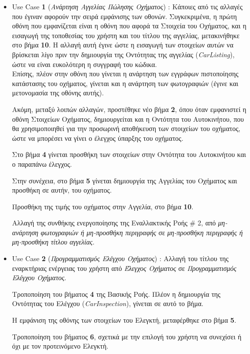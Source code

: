 \documentclass{../ol-softwaremanual}
\begin{document}
	\begin{itemize}
		\item \en Use Case \textbf{1} \gr (\textit{Ανάρτηση Αγγελίας Πώλησης Οχήματος}) : Κάποιες από τις  αλλαγές που έγιναν αφορούν την σειρά εμφάνισης των οθονών. Συγκεκριμένα, η πρώτη οθόνη που εμφανίζεται είναι η οθόνη που αφορά τα Στοιχεία του Οχήματος, και η εισαγωγή της τοποθεσίας του χρήστη και του τίτλου της αγγελίας, μετακινήθηκε στο βήμα \textbf{10}. Η αλλαγή αυτή έγινε ώστε η εισαγωγή των στοιχείων αυτών να βρίσκεται λίγο πριν την δημιουργία της Οντότητας της αγγελίας (\en \textit{CarListing}\gr), ώστε να είναι ευκολότερη η συγγραφή του κώδικα. \\
		
		Επίσης, πλέον στην οθόνη που γίνεται η ανάρτηση των εγγράφων πιστοποίησης κατάστασης του οχήματος, γίνεται και η ανάρτηση των φωτογραφιών (έγινε και μετονομασία της οθόνης αυτής).
		
		Ακόμη, μεταξύ λοιπών αλλαγών, προστέθηκε νέο βήμα \textbf{2}, όπου όταν εμφανιστεί η οθόνη Στοιχείων Οχήματος, δημιουργείται και η Οντότητα του Αυτοκινήτου, που θα χρησιμοποιηθεί για την προσωρινή αποθήκευση των στοιχείων του οχήματος, ώστε να μπορέσει να γίνει ο έλεγχος ύπαρξης του οχήματος.
		
		Στο βήμα \textbf{4} γίνεται προσθήκη των στοιχείων στην Οντότητα του Αυτοκινήτου και ο παραπάνω έλεγχος.
		
		Στην συνέχεια, στο βήμα \textbf{5} γίνεται δημιουργία της Αγγελίας του Οχήματος και προσθήκη σε αυτήν, του οχήματος.
		
		Προσθήκη της τιμής του οχήματος στην Αγγελία, στο βήμα \textbf{10}.	
		
		Αλλαγή της συνθήκης ενεργοποίησης της Εναλλακτικής Ροής \en \# 2\gr, από \textit{μη-ανάρτηση φωτογραφιών ή μη-προσθήκη περιγραφής} σε \textit{μη-προσθήκη περιγραφής ή μη-προσθήκη τίτλου αγγελίας}.
		
		\item \en Use Case \textbf{2} \gr (\textit{Προγραμματισμός Ελέγχου Οχήματος}) : Αλλαγή του τίτλου της εναρκτήριας ενέργειας του χρήστη από \textit{Έλεγχος Οχήματος} σε \textit{Προγραμματισμός Ελέγχου Οχήματος}.
		
		Τροποποίηση του βήματος \textbf{4} της Βασικής Ροής. Πλέον η δημιουργία της Οντότητας του Ελέγχου (\en \textit{CarInspection}\gr), γίνεται σε αυτό το βήμα.
		
		Η εμφάνιση της οθόνης των στοιχείων του Ελεγκτή, μεταφέρθηκε στο βήμα \textbf{5}.
		
		Τροποποίηση του βήματος \textbf{6}, σχετικά με την επιλογή του χρήστη να συνεχίσει ή όχι με τον προτεινόμενο Ελεγκτή.
		

\end{itemize}
\end{document}
